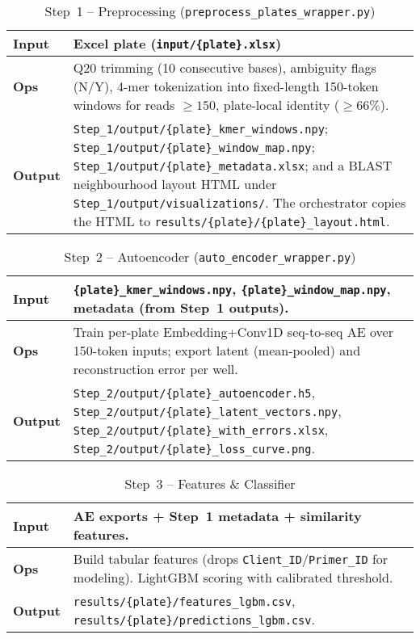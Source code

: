 \begin{table}[H]\centering
\caption{Step~1 -- Preprocessing (\texttt{preprocess\_plates\_wrapper.py})}
\begin{tabular}{|p{3.8cm}|p{9.8cm}|}\hline
\textbf{Input} & Excel plate (\texttt{input/\{plate\}.xlsx}) \\ \hline
\textbf{Ops} & Q20 trimming (10 consecutive bases), ambiguity flags (N/Y), 4-mer tokenization into fixed-length 150-token windows for reads $\geq 150$, plate-local identity ($\geq 66\%$). \\ \hline
\textbf{Output} & \texttt{Step\_1/output/\{plate\}\_kmer\_windows.npy}; \texttt{Step\_1/output/\{plate\}\_window\_map.npy}; \texttt{Step\_1/output/\{plate\}\_metadata.xlsx}; and a BLAST neighbourhood layout HTML under \texttt{Step\_1/output/visualizations/}. The orchestrator copies the HTML to \texttt{results/\{plate\}/\{plate\}\_layout.html}. \\ \hline
\end{tabular}
\end{table}

\begin{table}[H]\centering
\caption{Step~2 -- Autoencoder (\texttt{auto\_encoder\_wrapper.py})}
\begin{tabular}{|p{3.8cm}|p{9.8cm}|}\hline
\textbf{Input} & \texttt{\{plate\}\_kmer\_windows.npy}, \texttt{\{plate\}\_window\_map.npy}, metadata (from Step~1 outputs). \\ \hline
\textbf{Ops} & Train per-plate Embedding+Conv1D seq-to-seq AE over 150-token inputs; export latent (mean-pooled) and reconstruction error per well. \\ \hline
\textbf{Output} & \texttt{Step\_2/output/\{plate\}\_autoencoder.h5}, \texttt{Step\_2/output/\{plate\}\_latent\_vectors.npy}, \texttt{Step\_2/output/\{plate\}\_with\_errors.xlsx}, \texttt{Step\_2/output/\{plate\}\_loss\_curve.png}. \\ \hline
\end{tabular}
\end{table}

\begin{table}[H]\centering
\caption{Step~3 -- Features \& Classifier}
\begin{tabular}{|p{3.8cm}|p{9.8cm}|}\hline
\textbf{Input} & AE exports + Step~1 metadata + similarity features. \\ \hline
\textbf{Ops} & Build tabular features (drops \texttt{Client\_ID}/\texttt{Primer\_ID} for modeling). LightGBM scoring with calibrated threshold. \\ \hline
\textbf{Output} & \texttt{results/\{plate\}/features\_lgbm.csv}, \texttt{results/\{plate\}/predictions\_lgbm.csv}. \\ \hline
\end{tabular}
\end{table}

